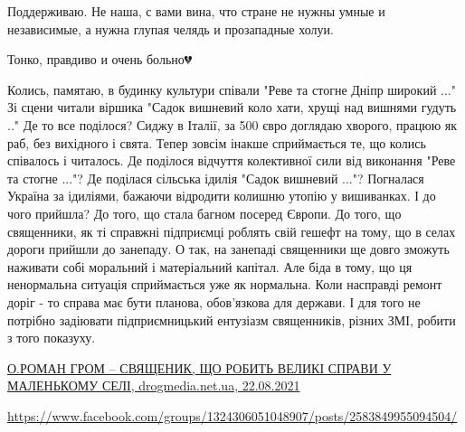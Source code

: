 \begin{itemize}
Поддерживаю. Не наша, с вами вина, что стране не нужны умные и независимые, а нужна глупая челядь и прозападные холуи.

 
Тонко, правдиво и очень больно💔

 

\obeycr
Колись, памятаю, в будинку культури співали
"Реве та стогне Дніпр широкий ..."
Зі сцени читали віршика
"Садок вишневий коло хати, хрущі над вишнями гудуть .."
Де то все поділося?
Сиджу в Італії, за 500 євро доглядаю хворого, працюю як раб, без вихідного і свята.
Тепер зовсім інакше сприймається те, що колись співалось і читалось.
Де поділося відчуття колективної сили від виконання "Реве та стогне ..."?
Де поділася сільська ідилія "Садок вишневий ..."?
Погналася Україна за ідиліями, бажаючи відродити колишню утопію у вишиванках.
І до чого прийшла?
До того, що стала багном посеред Європи.
До того, що священники, як ті справжні підприємці роблять свій гешефт на тому, що в селах дороги прийшли до занепаду.
О так, на занепаді священники ще довго зможуть наживати собі моральний і матеріальний капітал.
Але біда в тому, що ця ненормальна ситуація сприймається уже як нормальна.
Коли насправді ремонт доріг - то справа має бути планова, обов'язкова для держави. І для того не потрібно задіювати підприємницький ентузіазм священників, різних ЗМІ, робити з того показуху.
\restorecr

\href{https://drogmedia.net.ua/2021/08/22/o-roman-grom-svyashheny-k-shho-roby-t-vely-ki-spravy-u-malen-komu-seli/}{%
О.РОМАН ГРОМ – СВЯЩЕНИК, ЩО РОБИТЬ ВЕЛИКІ СПРАВИ У МАЛЕНЬКОМУ СЕЛІ, drogmedia.net.ua, 22.08.2021%
}

\url{https://www.facebook.com/groups/1324306051048907/posts/2583849955094504/}

 

\end{itemize}
